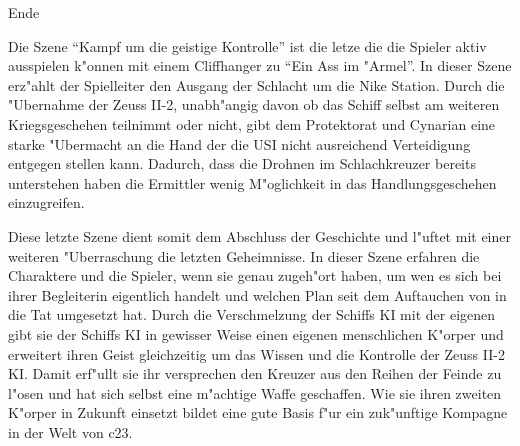 \begin{remarks}
	\begin{center}\huge{}Ende\end{center}

	Die Szene "`Kampf um die geistige Kontrolle"' ist die letze die die Spieler aktiv ausspielen k"onnen mit einem Cliffhanger zu "`Ein Ass im "Armel"'. In dieser Szene erz"ahlt der Spielleiter den Ausgang der Schlacht um die Nike Station. Durch die "Ubernahme der Zeuss II-2, unabh"angig davon ob das Schiff selbst am weiteren Kriegsgeschehen teilnimmt oder nicht, gibt dem Protektorat und Cynarian eine starke "Ubermacht an die Hand der die USI nicht ausreichend Verteidigung entgegen stellen kann. Dadurch, dass die Drohnen im Schlachkreuzer bereits \xl{} unterstehen haben die Ermittler wenig M"oglichkeit in das Handlungsgeschehen einzugreifen.

	Diese letzte Szene dient somit dem Abschluss der Geschichte und l"uftet mit einer weiteren "Uberraschung die letzten Geheimnisse. In dieser Szene erfahren die Charaktere und die Spieler, wenn sie genau zugeh"ort haben, um wen es sich bei ihrer Begleiterin eigentlich handelt und welchen Plan \xl{} seit dem Auftauchen von \ml{} in die Tat umgesetzt hat. Durch die Verschmelzung der Schiffs KI mit der eigenen gibt sie der Schiffs KI in gewisser Weise einen eigenen menschlichen K"orper und erweitert ihren Geist gleichzeitig um das Wissen und die Kontrolle der Zeuss II-2 KI. Damit erf"ullt sie ihr versprechen den Kreuzer aus den Reihen der Feinde zu l"osen und hat sich selbst eine m"achtige Waffe geschaffen. Wie sie ihren zweiten K"orper in Zukunft einsetzt bildet eine gute Basis f"ur ein zuk"unftige Kompagne in der Welt von c23.
\end{remarks}